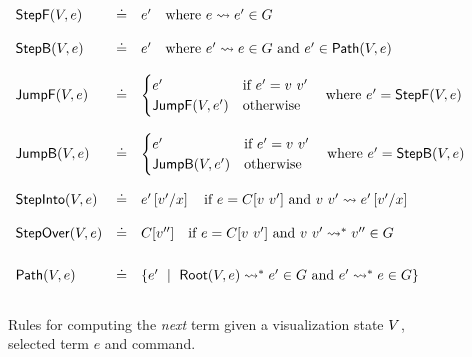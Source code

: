 \begin{figure*}[t]
\[
\begin{array}{lcl}
\stepforward{\vstate}{e}  & \defeq
  & e' \quad \mbox{where } \singlestep{e}{e'} \in \tr \\ \\

\stepbackward{\vstate}{e} & \defeq
  & e' \quad \mbox{where } \singlestep{e'}{e} \in \tr \mbox{ and } e' \in \vpath{\vstate}{e} \\ \\

\jumpforward{\vstate}{e} & \defeq
  & \begin{cases}
    e'                         & \mbox{if } e' = \eapp{v}{v'} \\
    \jumpforward{\vstate}{e'}  & \text{otherwise}
    \end{cases}
    \mbox{\quad where } e' = \stepforward{\vstate}{e} \\ \\

\jumpbackward{\vstate}{e} & \defeq
  & \begin{cases}
    e'                         & \mbox{if } e' = \eapp{v}{v'} \\
    \jumpbackward{\vstate}{e'} & \text{otherwise}
    \end{cases}
    \mbox{\quad where } e' = \stepbackward{\vstate}{e} \\ \\

\stepinto{\vstate}{e} & \defeq
  & e'\sub{x}{v'} \quad \mbox{if } e = C[\eapp{v}{v'}] \mbox{ and } \singlestep{\eapp{v}{v'}}{e'\sub{x}{v'}}  \\ \\

\stepover{\vstate}{e} & \defeq
  & C[v''] \quad \mbox{if } e = C[\eapp{v}{v'}] \mbox{ and } \multistep{\eapp{v}{v'}}{v''} \in \tr \\[0.25in]

\vpath{\vstate}{e} & \defeq
  & \{e' \spmid \multistep{\vroot{\vstate}{e}}{e'} \in \tr
                \mbox{ and }
                \multistep{e'}{e} \in \tr \} \\[0.15in]
\end{array}
\]
\caption{Rules for computing the \emph{next} term given a
         visualization state $\vstate$, selected term $e$
         and command.}
\label{fig:traversing-graph}
\end{figure*}
